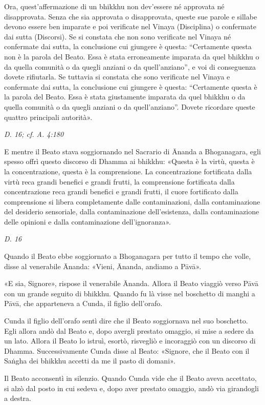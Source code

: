 Ora, quest’affermazione di un bhikkhu non dev’essere né approvata né
disapprovata. Senza che sia approvata o disapprovata, queste sue parole
e sillabe devono essere ben imparate e poi verificate nel Vinaya
(Disciplina) o confermate dai sutta (Discorsi). Se si constata che non
sono verificate nel Vinaya né confermate dai sutta, la conclusione cui
giungere è questa: “Certamente questa non è la parola del Beato. Essa è
stata erroneamente imparata da quel bhikkhu o da quella comunità o da
quegli anziani o da quell’anziano”, e voi di conseguenza dovete
rifiutarla. Se tuttavia si constata che sono verificate nel Vinaya e
confermate dai sutta, la conclusione cui giungere è questa: “Certamente
questa è la parola del Beato. Essa è stata giustamente imparata da quel
bhikkhu o da quella comunità o da quegli anziani o da quell’anziano”.
Dovete ricordare queste quattro principali autorità».


\emph{D. 16; cf. A. 4:180}


E mentre il Beato stava soggiornando nel Sacrario di Ānanda a
Bhoganagara, egli spesso offrì questo discorso di Dhamma ai bhikkhu:
«Questa è la virtù, questa è la concentrazione, questa è la
comprensione. La concentrazione fortificata dalla virtù reca grandi
benefici e grandi frutti, la comprensione fortificata dalla
concentrazione reca grandi benefici e grandi frutti, il cuore
fortificato dalla comprensione si libera completamente dalle
contaminazioni, dalla contaminazione del desiderio sensoriale, dalla
contaminazione dell’esistenza, dalla contaminazione delle opinioni e
dalla contaminazione dell’ignoranza».


\emph{D. 16}


Quando il Beato ebbe soggiornato a Bhoganagara per tutto il tempo che
volle, disse al venerabile Ānanda: «Vieni, Ānanda, andiamo a Pāvā».


«E sia, Signore», rispose il venerabile Ānanda. Allora il Beato viaggiò
verso Pāvā con un grande seguito di bhikkhu. Quando fu là visse nel
boschetto di manghi a Pāvā, che apparteneva a Cunda, il figlio
dell’orafo.


Cunda il figlio dell’orafo sentì dire che il Beato soggiornava nel suo
boschetto. Egli allora andò dal Beato e, dopo avergli prestato omaggio,
si mise a sedere da un lato. Allora il Beato lo istruì, esortò,
risvegliò e incoraggiò con un discorso di Dhamma. Successivamente Cunda
disse al Beato: «Signore, che il Beato con il Saṅgha dei bhikkhu accetti
da me il pasto di domani».


Il Beato acconsentì in silenzio. Quando Cunda vide che il Beato aveva
accettato, si alzò dal posto in cui sedeva e, dopo aver prestato
omaggio, andò via girandogli a destra.


